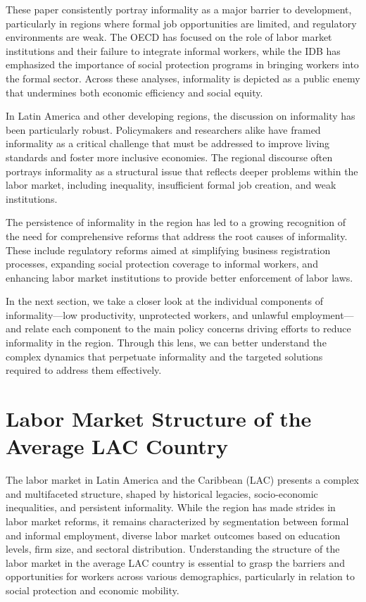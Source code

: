 \documentclass[english]{article}
\begin{document}
These paper consistently portray informality as a major barrier to development, particularly in regions where formal job opportunities are limited, and regulatory environments are weak. The OECD has focused on the role of labor market institutions and their failure to integrate informal workers, while the IDB has emphasized the importance of social protection programs in bringing workers into the formal sector. Across these analyses, informality is depicted as a public enemy that undermines both economic efficiency and social equity.

In Latin America and other developing regions, the discussion on informality has been particularly robust. Policymakers and researchers alike have framed informality as a critical challenge that must be addressed to improve living standards and foster more inclusive economies. The regional discourse often portrays informality as a structural issue that reflects deeper problems within the labor market, including inequality, insufficient formal job creation, and weak institutions.

The persistence of informality in the region has led to a growing recognition of the need for comprehensive reforms that address the root causes of informality. These include regulatory reforms aimed at simplifying business registration processes, expanding social protection coverage to informal workers, and enhancing labor market institutions to provide better enforcement of labor laws.

In the next section, we take a closer look at the individual components of informality—low productivity, unprotected workers, and unlawful employment—and relate each component to the main policy concerns driving efforts to reduce informality in the region. Through this lens, we can better understand the complex dynamics that perpetuate informality and the targeted solutions required to address them effectively.

\section{Labor Market Structure of the Average LAC Country}

The labor market in Latin America and the Caribbean (LAC) presents a complex and multifaceted structure, shaped by historical legacies, socio-economic inequalities, and persistent informality. While the region has made strides in labor market reforms, it remains characterized by segmentation between formal and informal employment, diverse labor market outcomes based on education levels, firm size, and sectoral distribution. Understanding the structure of the labor market in the average LAC country is essential to grasp the barriers and opportunities for workers across various demographics, particularly in relation to social protection and economic mobility.
\end{document}
